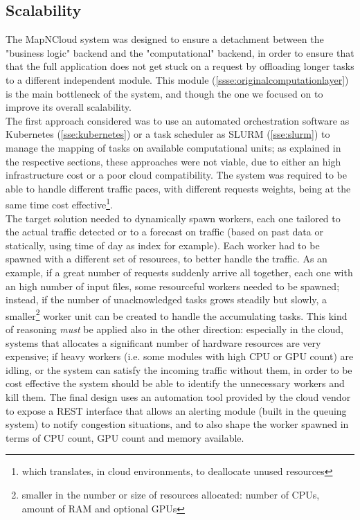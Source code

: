 \subsection{Scalability}
\label{sse:scalability}
  The MapNCloud system was designed to ensure a detachment between the "business logic" backend and the "computational" backend, in order to ensure that that the full application does not get stuck on a request by offloading longer tasks to a different independent module. This module (\ref{ssse:originalcomputationlayer}) is the main bottleneck of the system, and though the one we focused on to improve its overall scalability.\\
  The first approach considered was to use an automated orchestration software as Kubernetes (\ref{sse:kubernetes}) or a task scheduler as SLURM (\ref{sse:slurm}) to manage the mapping of tasks on available computational units; as explained in the respective sections, these approaches were not viable, due to either an high infrastructure cost or a poor cloud compatibility. The system was required to be able to handle different traffic paces, with different requests weights, being at the same time cost effective\footnote{which translates, in cloud environments, to deallocate unused resources}.\\
  The target solution needed to dynamically spawn workers, each one tailored to the actual traffic detected or to a forecast on traffic (based on past data or statically, using time of day as index for example). Each worker had to be spawned with a different set of resources, to better handle the traffic. As an example, if a great number of requests suddenly arrive all together, each one with an high number of input files, some resourceful workers needed to be spawned; instead, if the number of unacknowledged tasks grows steadily but slowly, a smaller\footnote{smaller in the number or size of resources allocated: number of CPUs, amount of RAM and optional GPUs} worker unit can be created to handle the accumulating tasks. This kind of reasoning \textit{must} be applied also in the other direction: especially in the cloud, systems that allocates a significant number of hardware resources are very expensive; if heavy workers (i.e. some modules with high CPU or GPU count) are idling, or the system can satisfy the incoming traffic without them, in order to be cost effective the system should be able to identify the unnecessary workers and kill them. The final design uses an automation tool provided by the cloud vendor to expose a REST interface that allows an alerting module (built in the queuing system) to notify congestion situations, and to also shape the worker spawned in terms of CPU count, GPU count and memory available.

